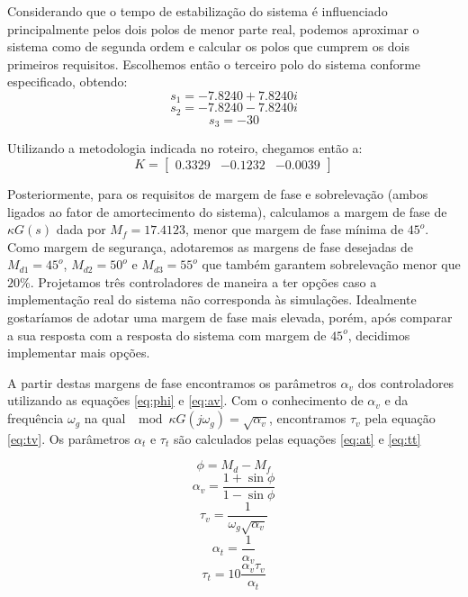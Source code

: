 \documentclass{article}
\begin{document}
Considerando que o tempo de estabilização do sistema é influenciado principalmente pelos dois polos de menor parte real, podemos aproximar o sistema como de segunda ordem e calcular os polos que cumprem os dois primeiros requisitos. Escolhemos então o terceiro polo do sistema conforme especificado, obtendo:
\begin{equation}
	s_1=-7.8240 + 7.8240i
\end{equation}
\begin{equation}
	s_2=-7.8240 - 7.8240i
\end{equation}
\begin{equation}
	s_3=-30
\end{equation}

Utilizando a metodologia indicada no roteiro\cite{bb:roteiro}, chegamos então a: 
\begin{equation}
\label{eq:matk}
K=
\begin{bmatrix}
0.3329 & -0.1232 & -0.0039
\end{bmatrix}
\end{equation}

Posteriormente, para os requisitos de margem de fase e sobrelevação (ambos ligados ao fator de amortecimento do sistema), calculamos a margem de fase de $\kappa G(s)$ dada por $M_f=17.4123$, menor que margem de fase mínima de $45^o$. Como margem de segurança, adotaremos as margens de fase desejadas de $M_{d1}=45^o$, $M_{d2}=50^o$ e $M_{d3}=55^o$ que também garantem sobrelevação menor que $20\%$. Projetamos três controladores de maneira a ter opções caso a implementação real do sistema não corresponda às simulações. Idealmente gostaríamos de adotar uma margem de fase mais elevada, porém, após comparar a sua resposta com a resposta do sistema com margem de $45^o$, decidimos implementar mais opções.

A partir destas margens de fase encontramos os parâmetros $\alpha_v$ dos controladores utilizando as equações \ref{eq:phi} e \ref{eq:av}. Com o conhecimento de $\alpha_v$ e da frequência $\omega_g$ na qual $\mod{\kappa G(j\omega_g)}=\sqrt{\alpha_v}$, encontramos $\tau_v$ pela equação \ref{eq:tv}. Os parâmetros $\alpha_t$ e $\tau_t$ são calculados pelas equações \ref{eq:at} e \ref{eq:tt}

\begin{equation}
\label{eq:phi}
\phi=M_d-M_f
\end{equation}
\begin{equation}
	\label{eq:av}
	\alpha_v=\frac{1+\sin{\phi}}{1-\sin{\phi}}
\end{equation}
\begin{equation}
	\label{eq:tv}
	\tau_v=\frac{1}{\omega_g \sqrt{\alpha_v}}
\end{equation}
\begin{equation}
\label{eq:at}
\alpha_t=\frac{1}{\alpha_v}
\end{equation}
\begin{equation}
\label{eq:tt}
\tau_t=10\frac{\alpha_v \tau_v}{\alpha_t}
\end{equation}
\end{document}
